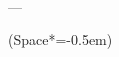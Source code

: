 \documentclass[12pt,letterpaper]{article}
\title{}
\author{}
\date{}
\begin{document}
\textbf{\thedate{}} \\
\textbf{\theauthor{}} \\
\textbf{\thetitle{}} \\
---

\begin{easylist}[enumerate]
	\ListProperties(Space*=-0.5em)
\end{easylist}
\end{document}
